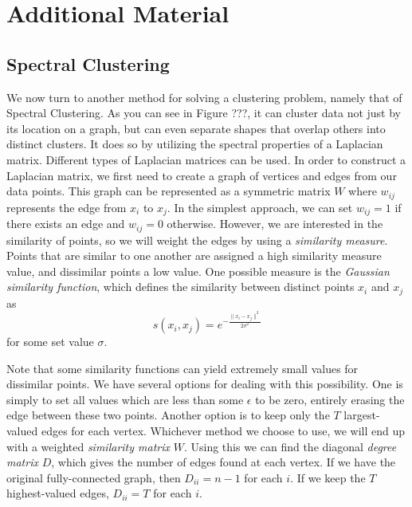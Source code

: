 \newpage

\section*{Additional Material} %

\subsection*{Spectral Clustering}
We now turn to another method for solving a clustering problem, namely that of Spectral Clustering.  As you can see in Figure ???, it can cluster data not just by its location on a graph, but can even separate shapes that overlap others into distinct clusters.  It does so by utilizing the spectral properties of a Laplacian matrix.  Different types of Laplacian matrices can be used.  In order to construct a Laplacian matrix, we first need to create a graph of vertices and edges from our data points.  This graph can be represented as a symmetric matrix $W$ where $w_{ij}$ represents the edge from $x_i$ to $x_j$.  In the simplest approach, we can set $w_{ij} = 1$ if there exists an edge and $w_{ij} = 0$ otherwise.  However, we are interested in the similarity of points, so we will weight the edges by using a \emph{similarity measure}.  Points that are similar to one another are assigned a high similarity measure value, and dissimilar points a low value.  One possible measure is the \emph{Gaussian similarity function}, which defines the similarity between distinct points $x_i$ and $x_j$ as
\begin{equation*}
s(x_i,x_j) = e^{- \frac{\| x_i - x_j \| ^2}{2 \sigma ^2}}
\end{equation*}
for some set value $\sigma$.

Note that some similarity functions can yield extremely small values for dissimilar points.  We have several options for dealing with this possibility.  One is simply to set all values which are less than some $\epsilon$ to be zero, entirely erasing the edge between these two points.  Another option is to keep only the $T$ largest-valued edges for each vertex.  Whichever method we choose to use, we will end up with a weighted \emph{similarity matrix} $W$.  Using this we can find the diagonal \emph{degree matrix} $D$, which gives the number of edges found at each vertex.  If we have the original fully-connected graph, then $D_{ii} = n-1$ for each $i$.  If we keep the $T$ highest-valued edges, $D_{ii} = T$ for each $i$.

